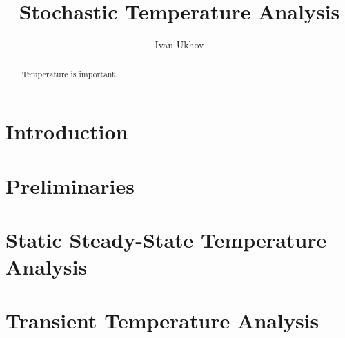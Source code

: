\documentclass[conference]{IEEEtran}
\begin{document}
  \title{Stochastic Temperature Analysis}
  \author{Ivan Ukhov}

  \maketitle

  \begin{abstract}
    Temperature is important.
  \end{abstract}

  \section{Introduction}  
  

  \section{Preliminaries}
  

  \section{Static Steady-State Temperature Analysis} 
  

  \section{Transient Temperature Analysis} 
  

  
  
\end{document}
